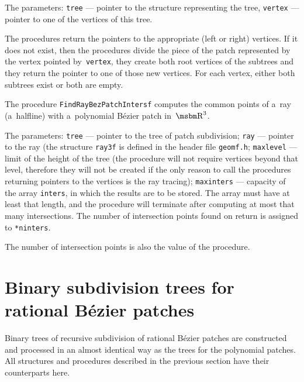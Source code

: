 The parameters: \texttt{tree} --- pointer to the structure representing the
tree, \texttt{vertex} --- pointer to one of the vertices of this tree.

The procedures return the pointers to the appropriate (left or right) vertices.
If it does not exist, then the procedures divide the piece of the patch
represented by the vertex pointed by~\texttt{vertex}, they create
both root vertices of the subtrees and they return the pointer to one of
those new vertices. For each vertex, either both subtrees exist
or both are empty.

\newpage
The procedure \texttt{FindRayBezPatchIntersf} computes the common points
of a~ray (a~halfline) with a~polynomial B\'{e}zier patch in~$\R^3$.

The parameters: \texttt{tree} --- pointer to the tree of patch subdivision;
\texttt{ray} --- pointer to the ray (the structure \texttt{ray3f} is defined
in the header file \texttt{geomf.h}; \texttt{maxlevel} --- limit of the height
of the tree (the procedure will not require vertices beyond that level,
therefore they will not be created if the only reason to call the
procedures returning pointers to the vertices is the ray tracing);
\texttt{maxinters} --- capacity of the array \texttt{inters}, in which the
results are to be stored. The array must have at least that length,
and the procedure will terminate after computing at most that many
intersections. The number of intersection points found on return
is assigned to \texttt{*ninters}.

The number of intersection points is also the value of the procedure.


\section{Binary subdivision trees for rational B\'{e}zier patches}

Binary trees of recursive subdivision of rational B\'{e}zier patches
are constructed and processed in an almost identical way as
the trees for the polynomial patches. All structures and procedures
described in the previous section have their counterparts here.

